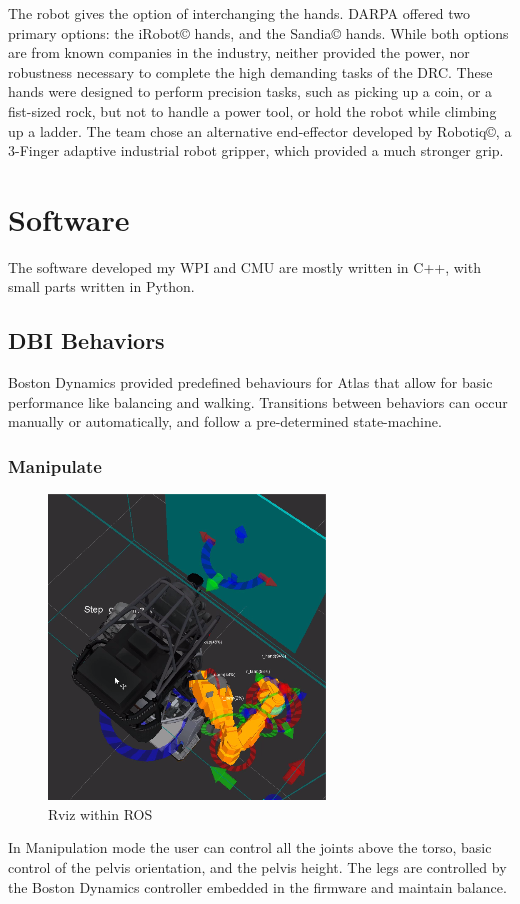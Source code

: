 \documentclass{article}
\begin{document}
The robot gives the option of interchanging the hands. DARPA offered two primary options: the iRobot© hands, and the Sandia© hands. While both options are from known companies in the industry, neither provided the power, nor robustness necessary to complete the high demanding tasks of the DRC. These hands were designed to perform precision tasks, such as picking up a coin, or a fist-sized rock, but not to handle a power tool, or hold the robot while climbing up a ladder. The team chose an alternative end-effector developed by Robotiq©, a 3-Finger adaptive industrial robot gripper, which provided a much stronger grip. 

\section{Software}
The software developed my WPI and CMU are mostly written in C++, with small parts written in Python. 

\subsection{DBI Behaviors}
Boston Dynamics provided predefined behaviours for Atlas that allow for basic performance like balancing and walking. Transitions between behaviors can occur manually or automatically, and follow a pre-determined state-machine.

\subsubsection{Manipulate}
\begin{figure}
  \begin{center}
    \includegraphics[scale=0.5]{images/align_to_wall.png}
  \end{center}
  \caption{Rviz within ROS}
\end{figure}
In Manipulation mode the user can control all the joints above the torso, basic control of the pelvis orientation, and the pelvis height. The legs are controlled by the Boston Dynamics controller embedded in the firmware and maintain balance.
\end{document}
